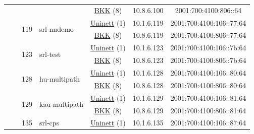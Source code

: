 \begin{small}
\begin{center}
\begin{longtable}{|c|c|c|c|c|c|c|c|}
  &  & \multicolumn{2}{|c|}{} & \multicolumn{2}{|c|}{\tiny{\href{http://bkk.no}{BKK} (8)}} & \tiny{10.8.6.100} & \tiny{2001:700:4100:806::64} \\* \cline{3-3}\cline{4-4}\cline{5-5}\cline{6-6}\cline{7-7}\cline{8-8}
  &  & \multirow{2}{*}{\tiny{119}} & \multicolumn{1}{|l|}{\multirow{2}{*}{\tiny{srl-nndemo}}} & \multicolumn{2}{|c|}{\tiny{\href{https://www.uninett.no}{Uninett} (1)}} & \tiny{10.1.6.119} & \tiny{2001:700:4100:106::77:64} \\* \cline{5-5}\cline{6-6}\cline{7-7}\cline{8-8}
  &  &  &  & \multicolumn{2}{|c|}{\tiny{\href{http://bkk.no}{BKK} (8)}} & \tiny{10.8.6.119} & \tiny{2001:700:4100:806::77:64} \\* \cline{3-3}\cline{4-4}\cline{5-5}\cline{6-6}\cline{7-7}\cline{8-8}
  &  & \multirow{2}{*}{\tiny{123}} & \multicolumn{1}{|l|}{\multirow{2}{*}{\tiny{srl-test}}} & \multicolumn{2}{|c|}{\tiny{\href{https://www.uninett.no}{Uninett} (1)}} & \tiny{10.1.6.123} & \tiny{2001:700:4100:106::7b:64} \\* \cline{5-5}\cline{6-6}\cline{7-7}\cline{8-8}
  &  &  &  & \multicolumn{2}{|c|}{\tiny{\href{http://bkk.no}{BKK} (8)}} & \tiny{10.8.6.123} & \tiny{2001:700:4100:806::7b:64} \\* \cline{3-3}\cline{4-4}\cline{5-5}\cline{6-6}\cline{7-7}\cline{8-8}
  &  & \multirow{2}{*}{\tiny{128}} & \multicolumn{1}{|l|}{\multirow{2}{*}{\tiny{hu-multipath}}} & \multicolumn{2}{|c|}{\tiny{\href{https://www.uninett.no}{Uninett} (1)}} & \tiny{10.1.6.128} & \tiny{2001:700:4100:106::80:64} \\* \cline{5-5}\cline{6-6}\cline{7-7}\cline{8-8}
  &  &  &  & \multicolumn{2}{|c|}{\tiny{\href{http://bkk.no}{BKK} (8)}} & \tiny{10.8.6.128} & \tiny{2001:700:4100:806::80:64} \\* \cline{3-3}\cline{4-4}\cline{5-5}\cline{6-6}\cline{7-7}\cline{8-8}
  &  & \multirow{2}{*}{\tiny{129}} & \multicolumn{1}{|l|}{\multirow{2}{*}{\tiny{kau-multipath}}} & \multicolumn{2}{|c|}{\tiny{\href{https://www.uninett.no}{Uninett} (1)}} & \tiny{10.1.6.129} & \tiny{2001:700:4100:106::81:64} \\* \cline{5-5}\cline{6-6}\cline{7-7}\cline{8-8}
  &  &  &  & \multicolumn{2}{|c|}{\tiny{\href{http://bkk.no}{BKK} (8)}} & \tiny{10.8.6.129} & \tiny{2001:700:4100:806::81:64} \\* \cline{3-3}\cline{4-4}\cline{5-5}\cline{6-6}\cline{7-7}\cline{8-8}
  &  & \multirow{2}{*}{\tiny{135}} & \multicolumn{1}{|l|}{\multirow{2}{*}{\tiny{srl-cps}}} & \multicolumn{2}{|c|}{\tiny{\href{https://www.uninett.no}{Uninett} (1)}} & \tiny{10.1.6.135} & \tiny{2001:700:4100:106::87:64} \\* \cline{5-5}\cline{6-6}\cline{7-7}\cline{8-8}

\end{longtable}
\end{center}
\end{small}

